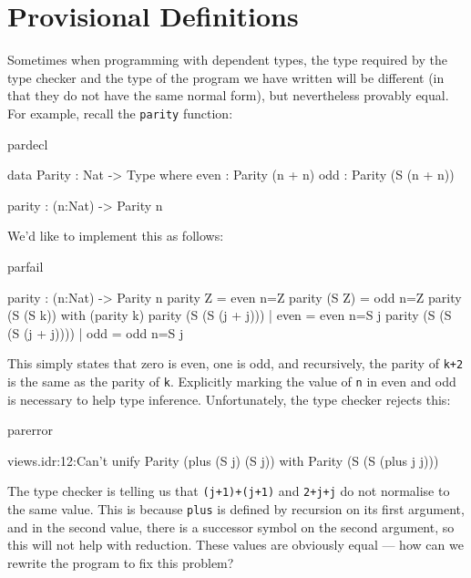 \section{Provisional Definitions}

Sometimes when programming with dependent types, the type required by the type
checker and the type of the program we have written will be different (in that
they do not have the same normal form), but nevertheless provably equal. For
example, recall the \texttt{parity} function:

\begin{SaveVerbatim}{pardecl}

data Parity : Nat -> Type where
   even : Parity (n + n)
   odd  : Parity (S (n + n))

parity : (n:Nat) -> Parity n

\end{SaveVerbatim}

\noindent
We'd like to implement this as follows:

\begin{SaveVerbatim}{parfail}

parity : (n:Nat) -> Parity n
parity Z     = even {n=Z}
parity (S Z) = odd {n=Z}
parity (S (S k)) with (parity k)
  parity (S (S (j + j)))     | even = even {n=S j}
  parity (S (S (S (j + j)))) | odd  = odd {n=S j}

\end{SaveVerbatim}

\noindent
This simply states that zero is even, one is odd, and recursively, the parity
of \texttt{k+2} is the same as the parity of \texttt{k}. 
Explicitly marking the value of \texttt{n} in
even and odd is necessary to help type inference. Unfortunately, the type
checker rejects this:

\begin{SaveVerbatim}{parerror}

views.idr:12:Can't unify Parity (plus (S j) (S j)) with 
Parity (S (S (plus j j)))

\end{SaveVerbatim}

\noindent
The type checker
is telling us that \texttt{(j+1)+(j+1)} and \texttt{2+j+j}
do not normalise to the same value.
This is because \texttt{plus} is defined by recursion on its first argument, and in the
second value, there is a successor symbol on the second argument, so this will
not help with reduction. These values are obviously equal --- how can we rewrite
the program to fix this problem?

